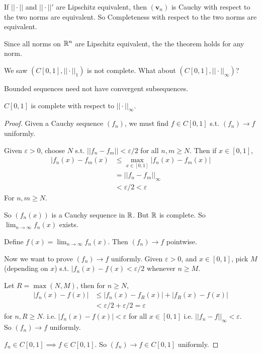 \documentclass[a4paper]{article}
\begin{document}
\begin{rem}
If $||\cdot||$ and $||\cdot||'$ are Lipschitz equivalent, then $\left(\mathbf{v}_n\right)$ is Cauchy with respect to the two norms are equivalent. So Completeness with respect to the two norms are equivalent.

Since all norms on $\mathbb{R}^n$ are Lipschitz equivalent, the the theorem holds for any norm. 

We saw $\left(C\left[0,1\right],||\cdot||_1\right)$ is not complete. What about $\left(C\left[0,1\right],||\cdot||_\infty\right)$?

Bounded sequences need not have convergent subsequences.
\end{rem}

\begin{thm}
$C\left[0,1\right]$ is complete with respect to $||\cdot||_\infty$.
\begin{proof}
Given a Cauchy sequence $\left(f_n\right)$, we must find $f\in C\left[0,1\right]$ s.t. $\left(f_n\right) \to f$ uniformly.

Given $\varepsilon>0$, choose $N$ s.t. $||f_n-f_m||<\varepsilon/2$ for all $n,m \geq N.$ Then if $x \in \left[0,1\right]$,
\begin{equation*}
\begin{aligned}
|f_n\left(x\right) - f_m\left(x\right) &\leq \max_{x \in \left[0,1\right]} |f_n\left(x\right) - f_m\left(x\right)|\\
&= ||f_n-f_m||_\infty\\
&<\varepsilon/2 < \varepsilon
\end{aligned}
\end{equation*}
For $n,m \geq N$.

So $\left(f_n\left(x\right)\right)$ is a Cauchy sequence in $\mathbb{R}$. But $\mathbb{R}$ is complete. So $\lim_{n \to \infty} f_n\left(x\right)$ exists.

Define $f\left(x\right) = \lim_{n\to\infty} f_n\left(x\right)$. Then $\left(f_n\right) \to f$ pointwise.

Now we want to prove $\left(f_n\right) \to f$ uniformly. Given $\varepsilon>0$, and $x \in \left[0,1\right]$, pick $M$ (depending on $x$) s.t. $|f_n\left(x\right)-f\left(x\right) < \varepsilon/2$ whenever $n\geq M$.

Let $R = \max\left(N,M\right)$, then for $n\geq N$,
\begin{equation*}
\begin{aligned}
|f_n\left(x\right) - f\left(x\right)| &\leq |f_n\left(x\right)-f_R\left(x\right)| + |f_R\left(x\right) - f\left(x\right)|\\
&< \varepsilon/2 + \varepsilon/2 = \varepsilon
\end{aligned}
\end{equation*}
for $n,R \geq N$.
i.e. $|f_n\left(x\right) - f\left(x\right)| < \varepsilon$ for all $x \in \left[0,1\right]$ i.e. $||f_n-f||_\infty < \varepsilon$.\\
So $\left(f_n\right) \to f$ uniformly.

$f_n\in C\left[0,1\right] \implies f\in C\left[0,1\right]$. So $\left(f_n\right) \to f\in C\left[0,1\right]$ uniformly.
\end{proof}
\end{thm}
\end{document}
